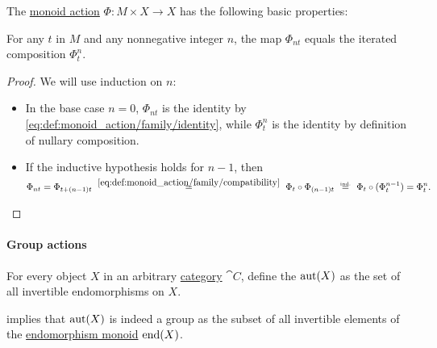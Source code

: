 \begin{proposition}\label{thm:def:monoid_action}
  The \hyperref[def:monoid_action]{monoid action} \( \Phi: M \times X \to X \) has the following basic properties:
  \begin{thmenum}
     For any \( t \) in \( M \) and any nonnegative integer \( n \), the map \( \Phi_{nt} \) equals the iterated composition \( \Phi_t^n \).
  \end{thmenum}
\end{proposition}
\begin{proof}
   We will use induction on \( n \):
  \begin{itemize}
    \item In the base case \( n = 0 \), \( \Phi_{nt} \) is the identity by \eqref{eq:def:monoid_action/family/identity}, while \( \Phi_t^n \) is the identity by definition of nullary composition.

    \item If the inductive hypothesis holds for \( n - 1 \), then
    \begin{equation*}
      \Phi_{nt}
      =
      \Phi_{t + (n - 1)t}
      \reloset {\eqref{eq:def:monoid_action/family/compatibility}} =
      \Phi_t \bincirc \Phi_{(n - 1)t}
      \reloset {\T{ind.}} =
      \Phi_t \bincirc (\Phi_t^{n-1})
      =
      \Phi_t^n.
    \end{equation*}
  \end{itemize}
\end{proof}

\paragraph{Group actions}

\begin{definition}\label{def:automorphism_group}
  For every object \( X \) in an arbitrary \hyperref[def:category]{category} \( \cat{C} \), define the  \( \operatorname{aut}(X) \) as the set of all invertible endomorphisms on \( X \).
\end{definition}
\begin{defproof}
   implies that \( \operatorname{aut}(X) \) is indeed a group as the subset of all invertible elements of the \hyperref[def:endomorphism_monoid]{endomorphism monoid} \( \operatorname{end}(X) \).
\end{defproof}

